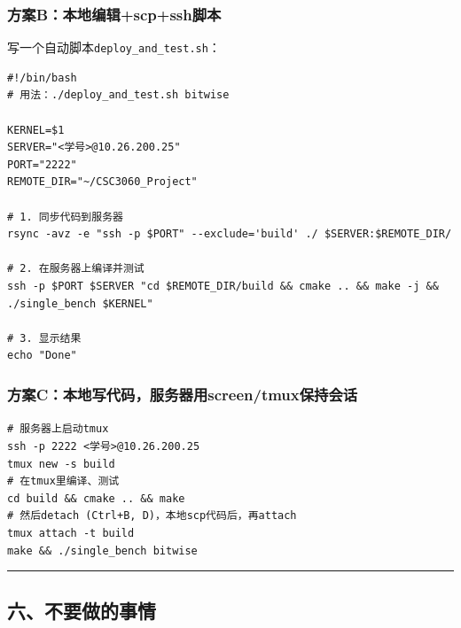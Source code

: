 \documentclass[11pt, a4paper]{article}
\begin{document}
\begin{aibox}
\subsubsection*{方案B：本地编辑+scp+ssh脚本}
写一个自动脚本\texttt{deploy\_and\_test.sh}：

\begin{tcolorbox}[colback=white,colframe=gray!50!white,boxrule=0.5pt,arc=2pt,left=5pt,right=5pt,top=5pt,bottom=5pt]
\begin{verbatim}
#!/bin/bash
# 用法：./deploy_and_test.sh bitwise

KERNEL=$1
SERVER="<学号>@10.26.200.25"
PORT="2222"
REMOTE_DIR="~/CSC3060_Project"

# 1. 同步代码到服务器
rsync -avz -e "ssh -p $PORT" --exclude='build' ./ $SERVER:$REMOTE_DIR/

# 2. 在服务器上编译并测试
ssh -p $PORT $SERVER "cd $REMOTE_DIR/build && cmake .. && make -j && ./single_bench $KERNEL"

# 3. 显示结果
echo "Done"
\end{verbatim}
\end{tcolorbox}

\subsubsection*{方案C：本地写代码，服务器用screen/tmux保持会话}
\begin{tcolorbox}[colback=white,colframe=gray!50!white,boxrule=0.5pt,arc=2pt,left=5pt,right=5pt,top=5pt,bottom=5pt]
\texttt{\# 服务器上启动tmux}\\
\texttt{ssh -p 2222 \textless 学号\textgreater @10.26.200.25}\\
\texttt{tmux new -s build}\\[0.5em]
\texttt{\# 在tmux里编译、测试}\\
\texttt{cd build \&\& cmake .. \&\& make}\\[0.5em]
\texttt{\# 然后detach (Ctrl+B, D)，本地scp代码后，再attach}\\
\texttt{tmux attach -t build}\\
\texttt{make \&\& ./single\_bench bitwise}
\end{tcolorbox}

\begin{center}\rule{\textwidth}{0.4pt}\end{center}

\subsection*{六、不要做的事情}


\end{aibox}
\end{document}
